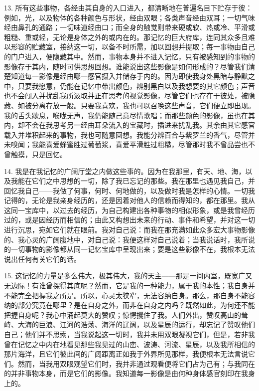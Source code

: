 13. 所有这些事物，各经由其自身的入口进入，都清晰地在普遍名目下贮存于彼：例如，光，以及物体的各种颜色与形状，经由双眼；各类声音经由双耳；一切气味经由鼻孔的通路；一切味道经由口；而全身的触觉则带来硬或软、热或冷、平滑或粗糙、重或轻，无论是身体之外的或内在的。那记忆的巨大府库，连同其众多且难以形容的贮藏室，接纳这一切，以备不时所需，加以回想并提取；每一事物由自己的门户进入，便隐藏其中。然而，事物本身并不进入记忆，只有被感知到的事物的影像存于其内，随时可供思想回想。谁能说出这些影像是如何形成的？尽管我们清楚知道每一影像是经由哪一感官摄入并储存于内的。因为即使我身处黑暗与静默之中，只要我愿意，仍能在记忆中带出颜色，辨别黑白以及我想要的其它颜色；声音也不会闯入并扰乱我所汲取并正在思考的视觉影像，尽管它们也存在于彼处，被隐藏、如被分离存放一般。只要我喜欢，我也可以召唤这些声音，它们便立即出现。我的舌头歇息，喉咙无声，我仍能随己意尽情歌唱；而那些颜色的影像，虽也在其内，却不会在我思考另一经由耳朵流入的宝藏时，插进来扰乱我。其余由其它感官载入并堆积起来的事物，我也可随意回想。我能分辨百合与紫罗兰的香气，尽管并未嗅闻；我能喜爱蜂蜜胜过葡萄浆，喜爱平滑胜过粗糙，尽管那时我不曾品尝也不曾触摸，只是回忆。\par

14. 我是在我记忆的广阔厅堂之内做这些事的。因为在我那里，有天、地、海，以及我能在它们之中思想的一切，除了我已忘记的那些。我在那里也遇见我自己，并回忆我自己——我做了何事，何时、何地做的，以及做时我是怎样的心情。一切我记得的，无论是我亲身经历的，还是因着对他人的信赖而得知的，都在那里。我从这同一宝库中，以过去的经历，为自己构建出各种事物的相似形象，或是我曾经历过的，或是因经历而相信的；由此又构想出未来的行动、事件和希望，并对这一切进行沉思，宛如它们就在眼前。我对自己说：而我在那充满如此众多宏大事物影像的、我心灵的广阔腹地中，对自己说：我便这样对自己说着；当我说话时，我所说的一切事物的影像都从同一记忆宝库中呈现出来；要是这些影像不在，我根本无法说出任何有关它们的话。\par

15. 这记忆的力量是多么伟大，极其伟大，我的天主——那是一间内室，既宽广又无边际！有谁曾探得其底呢？然而，它是我的一种能力，属于我的本性；我自身并不能完全把握我之所是。所以，心灵太狭窄，无法容纳自身。那么，那自身不能容纳的部分究竟在哪里？是在自身之外，而非在自身之内吗？既然如此，为何还不能把握自身呢？我心中涌起莫大的赞叹；惊愕攫住了我。人们外出，赞叹高山的耸峙、大海的巨浪、江河的浩荡、海洋的辽阔，以及星辰的运行，却忘记了赞叹他们自己；他们并不思索，当我说起这一切时，我并未用双眼凝视它们，但是，若非我曾在记忆之中内在地看见那些我见过的山峦、波涛、河流、星辰，以及我所相信的那片海洋，且它们彼此间的广阔距离正如我于外界所见那样，我便根本无法言说它们。然而，当我用双眼观望它们时，我并非通过观看便将它们占为己有；与我同在的并非事物本身，而是它们的影像。我知道每一影像是由何种身体感官刻印在我身上的。\par


